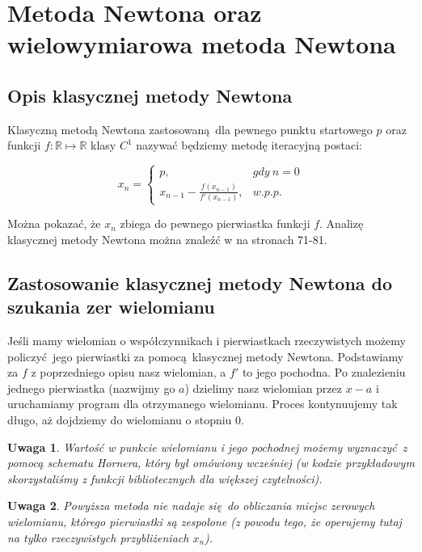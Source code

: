 \documentclass{article}
\newtheorem{remark}{Uwaga}
\begin{document}
\section{Metoda Newtona oraz wielowymiarowa metoda Newtona}

\subsection{Opis klasycznej metody Newtona}

Klasyczną metodą Newtona zastosowaną dla pewnego punktu startowego $p$ oraz funkcji $f : \mathbb{R} \mapsto \mathbb{R}$ klasy $C^{1}$ nazywać będziemy metodę iteracyjną postaci:

$$
x_n = \left\{\begin{matrix}
p, & gdy \ n = 0\\ 
x_{n-1} - \frac{f(x_{n-1})}{f'(x_{n-1})}, & w.p.p. 
\end{matrix}\right.
$$

Można pokazać, że $x_n$ zbiega do pewnego pierwiastka funkcji $f$. Analizę klasycznej metody Newtona można znaleźć w \cite{kincaid} na stronach 71-81.

\subsection{Zastosowanie klasycznej metody Newtona do szukania zer wielomianu}

Jeśli mamy wielomian o współczynnikach i pierwiastkach rzeczywistych możemy policzyć jego pierwiastki za pomocą klasycznej metody Newtona. Podstawiamy za $f$ z poprzedniego opisu nasz wielomian, a $f'$ to jego pochodna. Po znalezieniu jednego pierwiastka (nazwijmy go $a$) dzielimy nasz wielomian przez $x-a$ i uruchamiamy program dla otrzymanego wielomianu. Proces kontynuujemy tak długo, aż dojdziemy do wielomianu o stopniu $0$.

\begin{remark}
Wartość w punkcie wielomianu i jego pochodnej możemy wyznaczyć z pomocą schematu Hornera, który był omówiony wcześniej (w kodzie przykładowym skorzystaliśmy z funkcji bibliotecznych dla większej czytelności).
\end{remark}


\lstset{language=Haskell, label=DescriptiveLabel, frame=shadowbox}


\begin{remark}
Powyższa metoda nie nadaje się do obliczania miejsc zerowych wielomianu, którego pierwiastki są zespolone (z powodu tego, że operujemy tutaj na tylko rzeczywistych przybliżeniach $x_n$).
\end{remark}
\end{document}
